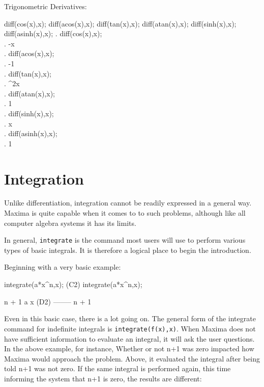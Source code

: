 Trigonometric Derivatives:

\beginmaximasession
diff(cos(x),x);
diff(acos(x),x);
diff(tan(x),x);
diff(atan(x),x);
diff(sinh(x),x);
diff(asinh(x),x);
\maximatexsession
{}.  diff(cos(x),x); \\
.   -\sin x \\
.  diff(acos(x),x); \\
.   -{{1}} \\
.  diff(tan(x),x); \\
.   \sec ^{2}x \\
.  diff(atan(x),x); \\
.   {{1}} \\
.  diff(sinh(x),x); \\
.   \cosh x \\
.  diff(asinh(x),x); \\
.   {{1}} \\
\endmaximasession

\section{Integration}

Unlike differentiation, integration cannot be readily expressed in a general
way.  Maxima is quite capable when it comes to to such problems, although
like all computer algebra systems it has its limits.

In general, {\tt integrate} is the command most users will use to perform
various types of basic integrals.  It is therefore a logical place to begin
the introduction.

Beginning with a very basic example:

\beginmaximasession
integrate(a*x^n,x);
\maximasession
(C2) integrate(a*x^n,x);

                                      n + 1
                                   a x
(D2)                               --------
                                    n + 1
\endmaximasession

Even in this basic case, there is a lot going on.  The general form of 
the integrate command for indefinite integrals is {\tt integrate(f(x),x)}.
When Maxima does not have sufficient information to evaluate an integral,
it will ask the user questions.  In the above example, for instance,
Whether or not n+1 was zero impacted how Maxima would approach the problem.
Above, it evaluated the integral after being told n+1 was not zero. If
the same integral is performed again, this time informing the system that
n+1 is zero, the results are different:

